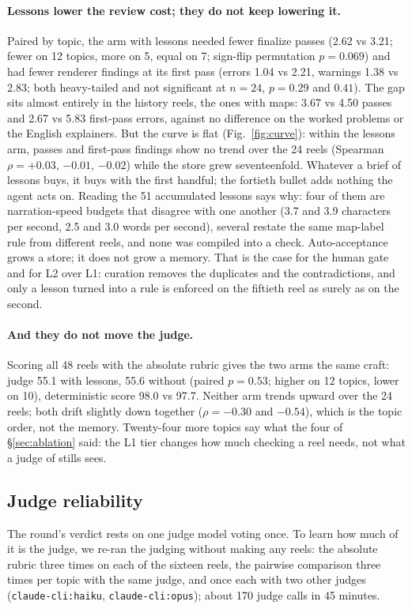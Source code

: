\documentclass[11pt]{article}
\begin{document}
\paragraph{Lessons lower the review cost; they do not keep lowering it.} Paired by topic, the arm
with lessons needed fewer finalize passes (2.62 vs 3.21; fewer on 12 topics, more on 5, equal on 7;
sign-flip permutation $p=0.069$) and had fewer renderer findings at its first pass (errors 1.04 vs
2.21, warnings 1.38 vs 2.83; both heavy-tailed and not significant at $n=24$, $p=0.29$ and $0.41$).
The gap sits almost entirely in the history reels, the ones with maps: 3.67 vs 4.50 passes and
2.67 vs 5.83 first-pass errors, against no difference on the worked problems or the English
explainers. But the curve is flat (Fig.~\ref{fig:curve}): within the lessons arm, passes and first-pass
findings show no trend over the 24 reels (Spearman $\rho = +0.03$, $-0.01$, $-0.02$) while the store
grew seventeenfold. Whatever a brief of lessons buys, it buys with the first handful; the fortieth
bullet adds nothing the agent acts on. Reading the 51 accumulated lessons says why: four of them are
narration-speed budgets that disagree with one another (3.7 and 3.9 characters per second, 2.5 and
3.0 words per second), several restate the same map-label rule from different reels, and none was
compiled into a check. Auto-acceptance grows a store; it does not grow a memory. That is the case for
the human gate and for L2 over L1: curation removes the duplicates and the contradictions, and only a
lesson turned into a rule is enforced on the fiftieth reel as surely as on the second.
\paragraph{And they do not move the judge.} Scoring all 48 reels with the absolute rubric gives the
two arms the same craft: judge 55.1 with lessons, 55.6 without (paired $p=0.53$; higher on 12 topics,
lower on 10), deterministic score 98.0 vs 97.7. Neither arm trends upward over the 24 reels; both
drift slightly down together ($\rho = -0.30$ and $-0.54$), which is the topic order, not the memory.
Twenty-four more topics say what the four of \S\ref{sec:ablation} said: the L1 tier changes how much
checking a reel needs, not what a judge of stills sees.

\subsection{Judge reliability}
\label{sec:reliability}
The round's verdict rests on one judge model voting once. To learn how much of it is the judge, we
re-ran the judging without making any reels: the absolute rubric three times on each of the sixteen
reels, the pairwise comparison three times per topic with the same judge, and once each with two other
judges (\texttt{claude-cli:haiku}, \texttt{claude-cli:opus}); about 170 judge calls in 45 minutes.
\end{document}
